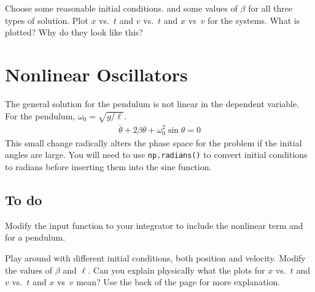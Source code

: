 \documentclass[]{article}
\renewcommand{\dot}[1]{\overset{\bm{.}}{#1}{}}
\renewcommand{\ddot}[1]{\overset{\bm{..}}{#1}{}}
\renewcommand{\_}{\char`_}
\begin{document}
\bq Choose some reasonable initial conditions. and some values of $\beta$ for all three types of solution. Plot $x$ vs.\ $t$ and $v$ vs.\ $t$ and $x$ vs\ $v$ for the systems. What is plotted? Why do they look like this?

\medskip\makebox[0.96\textwidth]{\hrulefill}

\medskip\makebox[0.96\textwidth]{\hrulefill}

\medskip\makebox[0.96\textwidth]{\hrulefill}
\eq
\eeq

\section{Nonlinear Oscillators}

The general solution for the pendulum is not linear in the dependent variable. For the pendulum, $\omega_0=\sqrt{g/\ell}$. 
\begin{align*}
\ddot{\theta} +2\beta\dot{\theta} +\omega_0^2 \sin \theta = 0
\end{align*}
This small change radically alters the phase space for the problem if the initial angles are large. You will need to use \texttt{np.radians()} to convert initial conditions to radians before inserting them into the sine function. 

\subsection{To do}
\bbq
\bq Modify the input function to your integrator to include the nonlinear term and for a pendulum. 
\eq

\bq Play around with different initial conditions, both position and velocity. Modify the values of $\beta$ and $\ell$. Can you explain physically what the plots for $x$ vs.\ $t$ and $v$ vs.\ $t$ and $x$ vs\ $v$ mean? Use the back of the page for more explanation. 

\medskip\makebox[0.96\textwidth]{\hrulefill}

\medskip\makebox[0.96\textwidth]{\hrulefill}

\medskip\makebox[0.96\textwidth]{\hrulefill}

\medskip\makebox[0.96\textwidth]{\hrulefill}

\medskip\makebox[0.96\textwidth]{\hrulefill}

\medskip\makebox[0.96\textwidth]{\hrulefill}

\eq
\eeq
\end{document}
